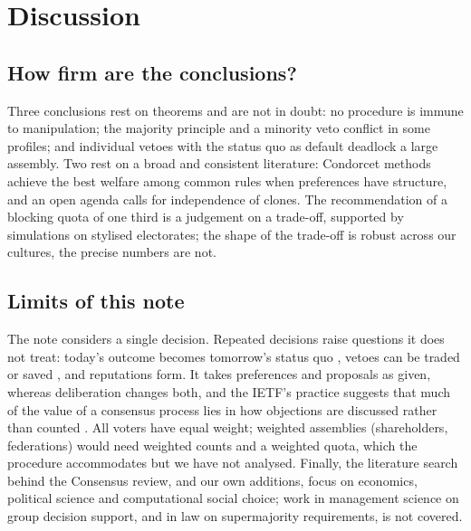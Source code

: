 \section{Discussion}\label{sec:discussion}

\subsection{How firm are the conclusions?}

Three conclusions rest on theorems and are not in doubt: no procedure is immune to manipulation; the
majority principle and a minority veto conflict in some profiles; and individual vetoes with the status
quo as default deadlock a large assembly. Two rest on a broad and consistent literature: Condorcet methods
achieve the best welfare among common rules when preferences have structure, and an open agenda calls for
independence of clones. The recommendation of a blocking quota of one third is a judgement on a
trade-off, supported by simulations on stylised electorates; the shape of the trade-off is robust across
our cultures, the precise numbers are not.

\subsection{Limits of this note}

The note considers a single decision. Repeated decisions raise questions it does not treat: today's
outcome becomes tomorrow's status quo \citep{DziudaLoeper2016}, vetoes can be traded or saved
\citep{Casella2005}, and reputations form. It takes preferences and proposals as given, whereas
deliberation changes both, and the IETF's practice suggests that much of the value of a consensus process
lies in how objections are discussed rather than counted \citep{Resnick2014rfc7282}. All voters have equal
weight; weighted assemblies (shareholders, federations) would need weighted counts and a weighted quota,
which the procedure accommodates but we have not analysed. Finally, the literature search behind the
Consensus review, and our own additions, focus on economics, political science and computational social
choice; work in management science on group decision support, and in law on supermajority requirements,
is not covered.

